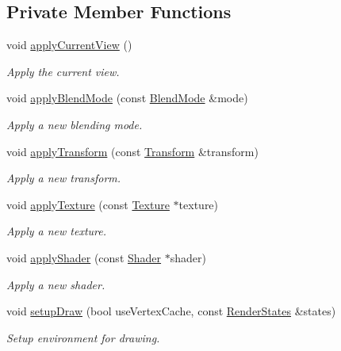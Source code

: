 \subsection*{Private Member Functions}
\begin{DoxyCompactItemize}
\item 
void \mbox{\hyperlink{classsf_1_1_render_target_a3ed439c5445e9c7d7ff786ff37005efa}{apply\+Current\+View}} ()
\begin{DoxyCompactList}\small\item\em Apply the current view. \end{DoxyCompactList}\item 
void \mbox{\hyperlink{classsf_1_1_render_target_ac1e4b4f29386768a626233f14b6eb745}{apply\+Blend\+Mode}} (const \mbox{\hyperlink{structsf_1_1_blend_mode}{Blend\+Mode}} \&mode)
\begin{DoxyCompactList}\small\item\em Apply a new blending mode. \end{DoxyCompactList}\item 
void \mbox{\hyperlink{classsf_1_1_render_target_a0b23bd7c287d0fc12b0521b649a0a0e0}{apply\+Transform}} (const \mbox{\hyperlink{classsf_1_1_transform}{Transform}} \&transform)
\begin{DoxyCompactList}\small\item\em Apply a new transform. \end{DoxyCompactList}\item 
void \mbox{\hyperlink{classsf_1_1_render_target_afb8a49305171aad158a27e0dfbb03709}{apply\+Texture}} (const \mbox{\hyperlink{classsf_1_1_texture}{Texture}} $\ast$texture)
\begin{DoxyCompactList}\small\item\em Apply a new texture. \end{DoxyCompactList}\item 
void \mbox{\hyperlink{classsf_1_1_render_target_a6f8bc92f07c70ccd57cbf632fe9de0ba}{apply\+Shader}} (const \mbox{\hyperlink{classsf_1_1_shader}{Shader}} $\ast$shader)
\begin{DoxyCompactList}\small\item\em Apply a new shader. \end{DoxyCompactList}\item 
void \mbox{\hyperlink{classsf_1_1_render_target_a92af454dcbd48a1d211411cbb306754e}{setup\+Draw}} (bool use\+Vertex\+Cache, const \mbox{\hyperlink{classsf_1_1_render_states}{Render\+States}} \&states)
\begin{DoxyCompactList}\small\item\em Setup environment for drawing. \end{DoxyCompactList}\item 

\end{DoxyCompactItemize}
